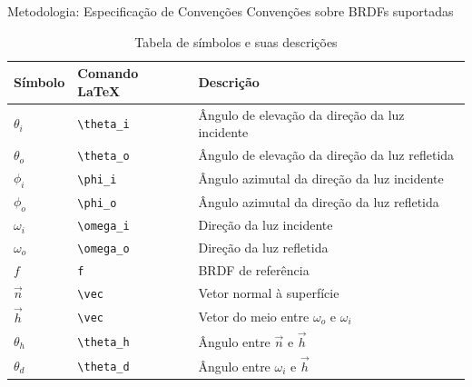 \begin{frame}[fragile]{Metodologia: Especificação de Convenções}
    Convenções sobre BRDFs suportadas
\begin{table}
\centering
    \scriptsize %
\begin{tabular}{l|l|l}
        \hline
        \textbf{Símbolo} &\textbf{Comando \LaTeX{}} & \textbf{Descrição} \\
        \hline
         $\theta_i$ & \verb"\theta_i" &Ângulo de elevação da direção da luz incidente \\ \hline
         $\theta_o$ & \verb"\theta_o" &Ângulo de elevação da direção da luz refletida \\ \hline
         $\phi_i$   & \verb"\phi_i"   &Ângulo azimutal da direção da luz incidente \\ \hline
         $\phi_o$   & \verb"\phi_o"   &Ângulo azimutal da direção da luz refletida \\ \hline
         $\omega_i$ & \verb"\omega_i" &Direção da luz incidente  \\ \hline
         $\omega_o$ & \verb"\omega_o" &Direção da luz refletida  \\ \hline
         $f$        & \verb"f"        &BRDF de referência \\ \hline
         $\vec{n}$  & \verb"\vec"     &Vetor normal à superfície \\ \hline
         $\vec{h}$  & \verb"\vec"     &Vetor do meio entre $\omega_o$ e $\omega_i$ \\ \hline
         $\theta_h$ & \verb"\theta_h" &Ângulo entre $\vec{n}$ e $\vec{h}$ \\ \hline
         $\theta_d$ & \verb"\theta_d" &Ângulo entre $\omega_i$ e $\vec{h}$ \\ \hline
\end{tabular}
    \caption{Tabela de símbolos e suas descrições}
    \label{tab-conventions-metodologia}
\label{tab-definition-of-lang}
\end{table}
\end{frame}

